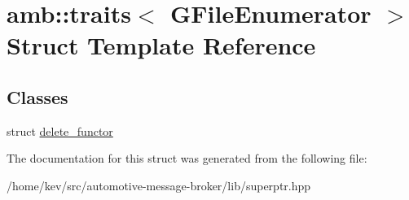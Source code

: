\hypertarget{structamb_1_1traits_3_01GFileEnumerator_01_4}{\section{amb\+:\+:traits$<$ G\+File\+Enumerator $>$ Struct Template Reference}
\label{structamb_1_1traits_3_01GFileEnumerator_01_4}
}
\subsection*{Classes}
\begin{DoxyCompactItemize}
\item 
struct \hyperlink{structamb_1_1traits_3_01GFileEnumerator_01_4_1_1delete__functor}{delete\+\_\+functor}
\end{DoxyCompactItemize}


The documentation for this struct was generated from the following file\+:\begin{DoxyCompactItemize}
\item 
/home/kev/src/automotive-\/message-\/broker/lib/superptr.\+hpp\end{DoxyCompactItemize}
